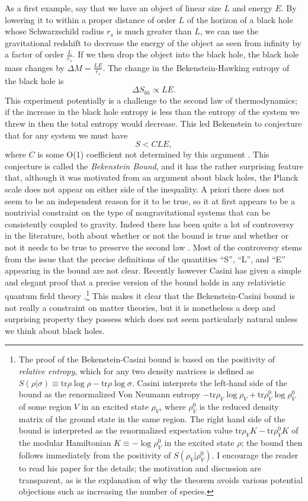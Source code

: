 \documentclass[12pt]{article}
\newcommand{\be}{\begin{equation}}
\newcommand{\ee}{\end{equation}}
\begin{document}
As a first example, say that we have an object of linear size $L$ and energy $E$.  By lowering it to within a proper distance of order $L$ of the horizon of a black hole whose Schwarzschild radius $r_s$ is much greater than $L$, we can use the gravitational redshift to decrease the energy of the object as seen from infinity by a factor of order $\frac{L}{r_s}$.  If we then drop the object into the black hole, the black hole mass changes by $\Delta M=\frac{LE}{r_s}$.  The change in the Bekenstein-Hawking entropy of the black hole is
\be
\Delta S_{\mathit{bh}} \propto LE.
\ee
This experiment potentially is a challenge to the second law of thermodynamics; if the increase in the black hole entropy is less than the entropy of the system we threw in then the total entropy would decrease.  This led Bekenstein to conjecture that for any system we must have
\be\label{bekbound}
S<CLE,
\ee 
where $C$ is some O(1) coefficient not determined by this argument \cite{Bekenstein:1980jp}.  This conjecture is called the \textit{Bekenstein Bound}, and it has the rather surprising feature that, although it was motivated from an argument about black holes, the Planck scale does not appear on either side of the inequality.  A priori there does not seem to be an independent reason  for it to be true, so it at first appears to be a nontrivial constraint on the type of nongravitational systems that can be consistently coupled to gravity.  Indeed there has been quite a lot of controversy in the literature, both about whether or not the bound is true and whether or not it needs to be true to preserve the second law \cite{Unruh:1982ic,Marolf:2003wu,Marolf:2003sq}.  Most of the controversy stems from the issue that the precise definitions of the quantities ``S'', ``L'', and ``E'' appearing in the bound are not clear.  Recently however Casini has given a simple and elegant proof that a precise version of the bound holds in any relativistic quantum field theory \cite{Casini:2008cr}.\footnote{The proof of the Bekenstein-Casini bound is based on the positivity of \textit{relative entropy}, which for any two density matrices is defined as $S(\rho|\sigma)\equiv \mathrm{tr}\rho \log \rho-\mathrm{tr} \rho \log \sigma$.  Casini interprets the left-hand side of the bound as the renormalized Von Neumann entropy $-\mathrm{tr}\rho_V \log \rho_V+\mathrm{tr}\rho_V^0 \log \rho_V^0$ of some region $V$ in an excited state $\rho_V$, where $\rho_V^0$ is the reduced density matrix of the ground state in the same region.  The right hand side of the bound is interpreted as the renormalized expectation value $\mathrm{tr} \rho_V K-\mathrm{tr} \rho_V^0 K$ of the modular Hamiltonian $K\equiv -\log \rho^0_V$ in the excited state $\rho$; the bound then follows immediately from the positivity of $S(\rho_V|\rho_V^0)$.  I encourage the reader to read his paper for the details; the motivation and discussion are transparent, as is the explanation of why the theorem avoids various potential objections such as increasing the number of species.}  This makes it clear that the Bekenstein-Casini bound is not really a constraint on matter theories, but it is nonetheless a deep and surprising property they possess which does not seem particularly natural unless we think about black holes. 
 
\end{document}
